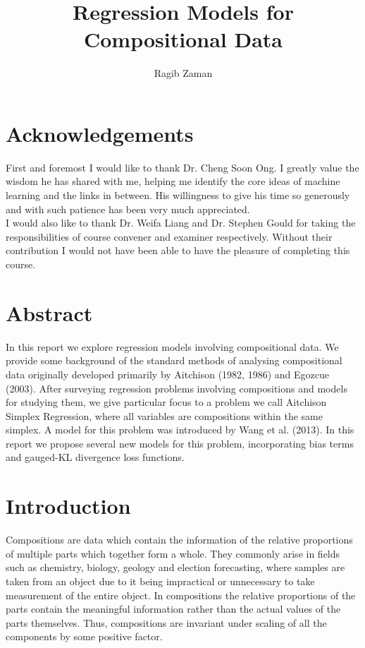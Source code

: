 \documentclass[BSc]{usydthesis}
\author{Ragib Zaman}
\title{Regression Models for Compositional Data}
\numberwithin{equation}{chapter}
\theoremstyle{remark}
\begin{document}
  


\maketitle          %

\chapter*{Acknowledgements}
First and foremost I would like to thank Dr. Cheng Soon Ong. I greatly value the wisdom he has shared with me, helping me identify the core ideas of machine learning and the links in between. His willingness to give his time so generously and with such patience has been very much appreciated.\\

I would also like to thank Dr. Weifa Liang and Dr. Stephen Gould for taking the responsibilities of course convener and examiner respectively. Without their contribution I would not have been able to have the pleasure of completing this course. 

\chapter*{Abstract}
In this report we explore regression models involving compositional data. We provide some background of the standard methods of analysing compositional data originally developed primarily by Aitchison (1982, 1986) and Egozcue (2003). After surveying regression problems involving compositions and models for studying them, we give particular focus to a problem we call Aitchison Simplex Regression, where all variables are compositions within the same simplex. A model for this problem was introduced by Wang et al. (2013). In this report we propose several new models for this problem, incorporating bias terms and gauged-KL divergence loss functions.\\ 



\tableofcontents    %

\newpage\setcounter{page}{1}

\chapter{Introduction}
Compositions are data which contain the information of the relative proportions of multiple parts which together form a whole. They commonly arise in fields such as chemistry, biology, geology and election forecasting, where samples are taken from an object due to it being impractical or unnecessary to take measurement of the entire object. In compositions the relative proportions of the parts contain the meaningful information rather than the actual values of the parts themselves. Thus, compositions are invariant under scaling of all the components by some positive factor.\\
\end{document}
